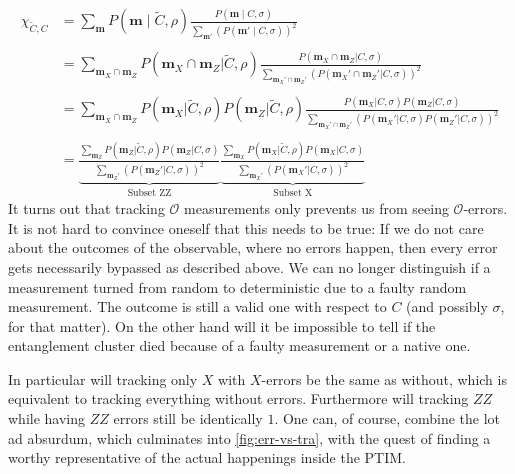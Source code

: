 \begin{align}
      \label{eq:lxe-subset-err}
      \chi_{\tilde{C},C} &= \sum_{\mathbf{m}} P(\mathbf{m} \mid \tilde{C}, \rho) \frac{P(\mathbf{m} \mid
      C, \sigma)}{\sum_{\mathbf{m}'}\left(P(\mathbf{m}' \mid
      C, \sigma)\right)^2} \nonumber\\
      \nonumber\\
      &= \sum_{\mathbf{m}_X \cap \mathbf{m}_Z} P(\mathbf{m}_X \cap \mathbf{m}_Z |
        \tilde{C}, \rho) \frac{P(\mathbf{m}_X \cap \mathbf{m}_Z| C,
        \sigma)}{\sum_{\mathbf{m}_X' \cap \mathbf{m}_Z'} \left(P(\mathbf{m}_X' \cap
        \mathbf{m}_Z'|C,\sigma)\right)^2}\nonumber\\
        \nonumber\\
      &= \sum_{\mathbf{m}_X \cap \mathbf{m}_Z} P(\mathbf{m}_X | \tilde{C}, \rho) P(
        \mathbf{m}_Z | \tilde{C}, \rho) \frac{P(\mathbf{m}_X | C, \sigma) P( \mathbf{m}_Z|
        C, \sigma)}{\sum_{\mathbf{m}_X' \cap \mathbf{m}_Z'}
          \left(P(\mathbf{m}_X' | C,
        \sigma) P( \mathbf{m}_Z'|C,\sigma)\right)^2}\nonumber\\
        \nonumber\\
      &= \underbrace{\frac{\sum_{\mathbf{m}_Z} P(\mathbf{m}_Z | \tilde{C}, \rho)
          P(\mathbf{m}_Z | C, \sigma)}{\sum_{\mathbf{m}_Z'}
          \left(P(\mathbf{m}_Z' |
          C, \sigma)\right)^2}}_{\text{Subset ZZ}}
          \underbrace{\frac{\sum_{\mathbf{m}_X} P(\mathbf{m}_X | \tilde{C}, \rho)
          P(\mathbf{m}_X | C, \sigma)}{\sum_{\mathbf{m}_X'}
          \left(P(\mathbf{m}_X' |
          C, \sigma)\right)^2}}_{\text{Subset X}}
\end{align}
It turns out that tracking $\mathcal{O}$ measurements only prevents us from
seeing $\mathcal{O}$-errors. It is not hard to convince oneself that this needs to
be true: If we do not care about the outcomes of the observable, where no errors
happen, then every error gets necessarily bypassed as described above. We can
no longer distinguish if a measurement turned from random to deterministic due
to a faulty random measurement. The outcome is still a valid one with respect to
$C$ (and possibly $\sigma$, for that matter). On the other hand will it be
impossible to tell if the entanglement cluster died because of a faulty
measurement or a native one. 

In particular will tracking only $X$ with $X$-errors be the same as without, which
is equivalent to tracking everything without errors. Furthermore will tracking
$ZZ$ while having $ZZ$ errors still be identically $1$. One can, of course,
combine the lot ad absurdum, which culminates into \cref{fig:err-vs-tra}, with
the quest of finding a worthy representative of the actual happenings inside
the PTIM.

